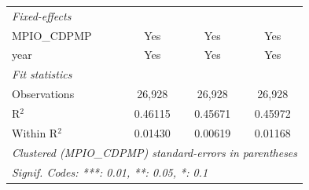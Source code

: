\begin{tabular}{lccc}
   \emph{Fixed-effects}\\
   MPIO\_CDPMP                         & Yes                 & Yes                        & Yes\\  
   year                                & Yes                 & Yes                        & Yes\\  
   \midrule
   \emph{Fit statistics}\\
   Observations                        & 26,928              & 26,928                     & 26,928\\  
   R$^2$                               & 0.46115             & 0.45671                    & 0.45972\\  
   Within R$^2$                        & 0.01430             & 0.00619                    & 0.01168\\  
   \midrule \midrule
   \multicolumn{4}{l}{\emph{Clustered (MPIO\_CDPMP) standard-errors in parentheses}}\\
   \multicolumn{4}{l}{\emph{Signif. Codes: ***: 0.01, **: 0.05, *: 0.1}}\\
\end{tabular}
\par\endgroup


